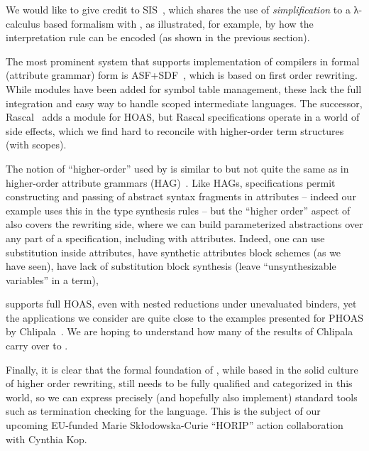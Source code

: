 \documentclass[letterpaper,11pt]{article}
\begin{document}
We would like to give credit to SIS~\cite{Mosses:daimi1979}, which shares the use of
\emph{simplification} to a λ-calculus based formalism with \HAX, as illustrated, for example, by how
the interpretation rule can be encoded (as shown in the previous section).

The most prominent system that supports implementation of compilers in formal (attribute grammar)
form is ASF+SDF~\cite{Brand+:toplas2002}, which is based on first order rewriting. While modules
have been added for symbol table management, these lack the full integration and easy way to handle
scoped intermediate languages. The successor, Rascal~\cite{Bos+:eptcs2011} adds a module for HOAS,
but Rascal specifications operate in a world of side effects, which we find hard to reconcile with
higher-order term structures (with scopes).

The notion of ``higher-order'' used by \HAX is similar to but not quite the same as in higher-order
attribute grammars (HAG)~\cite{VogtSwierstraKuiper:pldi1989}. Like HAGs, \HAX specifications permit
constructing and passing of abstract syntax fragments in attributes -- indeed our example uses this
in the type synthesis rules -- but the ``higher order'' aspect of \HAX also covers the rewriting
side, where we can build parameterized abstractions over any part of a specification, including with
attributes. Indeed, one can use substitution inside attributes, have synthetic attributes block
schemes (as we have seen), have lack of substitution block synthesis (leave ``unsynthesizable
variables'' in a term), \etc

\HAX supports full HOAS, even with nested reductions under unevaluated binders, yet the applications
we consider are quite close to the examples presented for PHOAS by
Chlipala~\cite{Chlipala:icfp2008}. We are hoping to understand how many of the results of Chlipala
carry over to \HAX.

Finally, it is clear that the formal foundation of \HAX, while based in the solid culture of higher
order rewriting, still needs to be fully qualified and categorized in this world, so we can express
precisely (and hopefully also implement) standard tools such as termination checking for the
language. This is the subject of our upcoming EU-funded Marie Skłodowska-Curie ``HORIP'' action
collaboration with Cynthia Kop.
\end{document}
